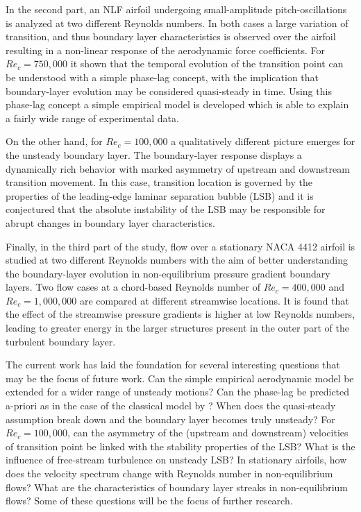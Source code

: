 In the second part, an NLF airfoil undergoing small-amplitude pitch-oscillations is analyzed at two different Reynolds numbers. In both cases a large variation of transition, and thus boundary layer characteristics is observed over the airfoil resulting in a non-linear response of the aerodynamic force coefficients. For $Re_{c}=750,000$ it shown that the temporal evolution of the transition point can be understood with a simple phase-lag concept, with the implication that boundary-layer evolution may be considered quasi-steady in time. Using this phase-lag concept a simple empirical model is developed which is able to explain a fairly wide range of experimental data.

On the other hand, for $Re_{c}=100,000$ a qualitatively different picture emerges for the unsteady boundary layer. The boundary-layer response displays a dynamically rich behavior with marked asymmetry of upstream and downstream transition movement. In this case, transition location is governed by the properties of the leading-edge laminar separation bubble (LSB) and it is conjectured that the absolute instability of the LSB may be responsible for abrupt changes in boundary layer characteristics.

Finally, in the third part of the study, flow over a stationary NACA 4412 airfoil is studied at two different Reynolds numbers with the aim of better understanding the boundary-layer evolution in non-equilibrium pressure gradient boundary layers. Two flow cases at a chord-based Reynolds number of $Re_{c}=400,000$ and $Re_{c}=1,000,000$ are compared at different streamwise locations. It is found that the effect of the streamwise pressure gradients is higher at low Reynolds numbers, leading to greater energy in the larger structures present in the outer part of the turbulent boundary layer.

The current work has laid the foundation for several interesting questions that may be the focus of future work. Can the simple empirical aerodynamic model be extended for a wider range of unsteady motions? Can the phase-lag be predicted a-priori as in the case of the classical model by \cite{theodorsen35}? When does the quasi-steady assumption break down and the boundary layer becomes truly unsteady? For $Re_{c}=100,000$, can the asymmetry of the (upstream and downstream) velocities of transition point be linked with the stability properties of the LSB? What is the influence of free-stream turbulence on unsteady LSB? In stationary airfoils, how does the velocity spectrum change with Reynolds number in non-equilibrium flows? What are the characteristics of boundary layer streaks in non-equilibrium flows? Some of these questions will be the focus of further research.


%



%


%
